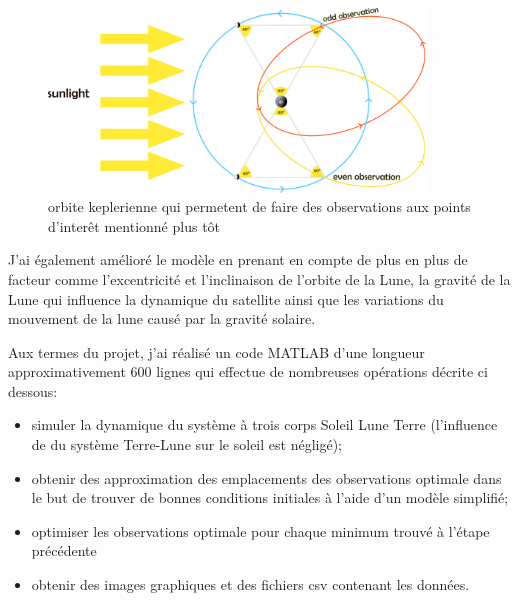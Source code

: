 \documentclass{article} %
\begin{document}
		
		\begin{figure}[h]
			\includegraphics[width=10cm]{images/observations_main.png}
			\caption{orbite keplerienne qui permetent de faire des observations aux points d'interêt mentionné plus tôt}
		\end{figure}
		
		
		J'ai également amélioré le modèle en prenant en compte de plus en plus de facteur comme l'excentricité et l'inclinaison de l'orbite de la Lune, la gravité de la Lune qui influence la dynamique du satellite ainsi que les variations du mouvement de la lune causé par la gravité solaire.
		
		Aux termes du projet, j'ai réalisé un code MATLAB d'une longueur approximativement 600 lignes qui effectue de nombreuses opérations décrite ci dessous: 
		
		\begin{itemize}
			\item simuler la dynamique du système à trois corps Soleil Lune Terre (l'influence de du système Terre-Lune sur le soleil est négligé);
			\item obtenir des approximation des emplacements des observations optimale dans le but de trouver de bonnes conditions initiales à l'aide d'un modèle simplifié;
			\item optimiser les observations optimale pour chaque minimum trouvé à l'étape précédente
			\item obtenir des images graphiques et des fichiers csv contenant les données.
		\end{itemize}
		
\end{document}
